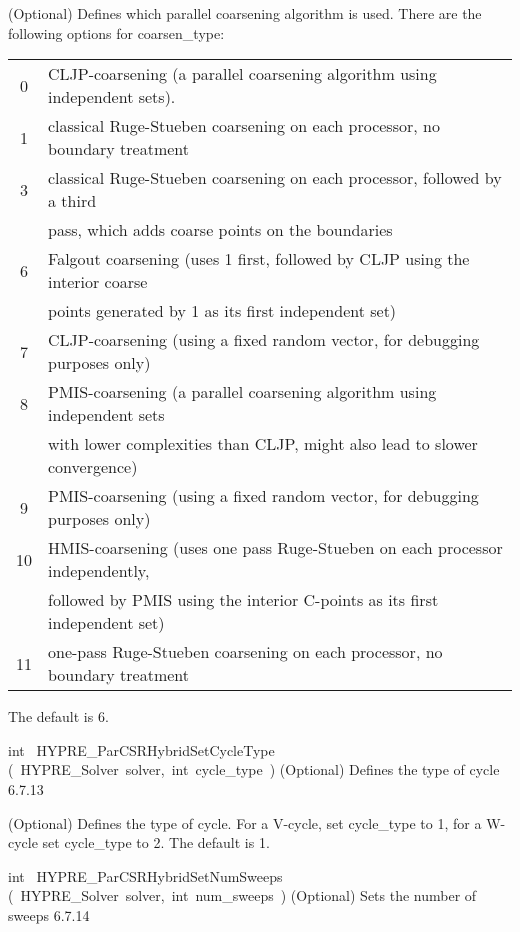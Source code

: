 \documentclass{article}
\begin{document}
\begin{cxxentry}
\begin{cxxentry}
\begin{cxxfunction}
\begin{cxxdoc}
(Optional) Defines which parallel coarsening algorithm is used.
There are the following options for coarsen\_type:

\begin{tabular}{|c|l|} \hline
0 &  CLJP-coarsening (a parallel coarsening algorithm using independent sets). \\
1 &  classical Ruge-Stueben coarsening on each processor, no boundary treatment \\
3 &  classical Ruge-Stueben coarsening on each processor, followed by a third \\
&  pass, which adds coarse points on the boundaries \\
6 &  Falgout coarsening (uses 1 first, followed by CLJP using the interior coarse \\
& points generated by 1 as its first independent set) \\
7 &  CLJP-coarsening (using a fixed random vector, for debugging purposes only) \\
8 &  PMIS-coarsening (a parallel coarsening algorithm using independent sets \\
& with lower complexities than CLJP, might also lead to slower convergence) \\
9 &  PMIS-coarsening (using a fixed random vector, for debugging purposes only) \\
10 & HMIS-coarsening (uses one pass Ruge-Stueben on each processor independently, \\
& followed by PMIS using the interior C-points as its first independent set) \\
11 & one-pass Ruge-Stueben coarsening on each processor, no boundary treatment \\
\hline
\end{tabular}

The default is 6.
\end{cxxdoc}
\end{cxxfunction}
\begin{cxxfunction}
{int\ }
        {HYPRE\_ParCSRHybridSetCycleType}
        {(\ HYPRE\_Solver\ solver,\ int\ cycle\_type\ )}
        {
(Optional) Defines the type of cycle}
        {6.7.13}
\begin{cxxdoc}

(Optional) Defines the type of cycle.
For a V-cycle, set cycle\_type to 1, for a W-cycle
set cycle\_type to 2. The default is 1.
\end{cxxdoc}
\end{cxxfunction}
\begin{cxxfunction}
{int\ }
        {HYPRE\_ParCSRHybridSetNumSweeps}
        {(\ HYPRE\_Solver\ solver,\ int\ num\_sweeps\ )}
        {
(Optional) Sets the number of sweeps}
        {6.7.14}
\begin{cxxdoc}


\end{cxxdoc}
\end{cxxfunction}
\end{cxxentry}
\end{cxxentry}
\end{document}
